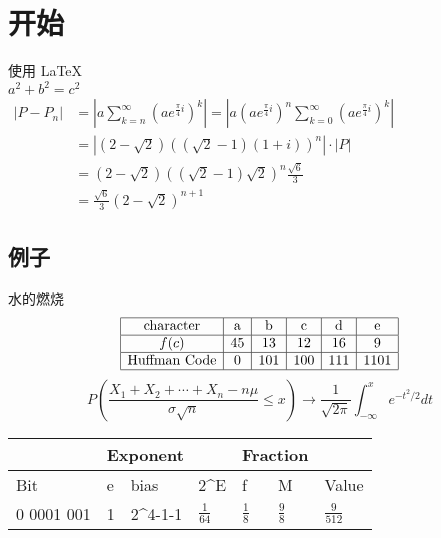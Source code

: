 \documentclass[UTF8]{article}
\begin{document}
       
 
\section{开始}   
使用       
\LaTeX \,\\ 
 $a^2+b^2=c^2$\\
 $\begin{aligned}
    \left|P-P_{n}\right|&=\left|a \sum_{k=n}^{\infty}\left(a e^{\frac{\pi}{4} i}\right)^{k}\right|=\left|a\left(a e^{\frac{\pi}{4} i}\right)^{n} \sum_{k=0}^{\infty}\left(a e^{\frac{\pi}{4} i}\right)^{k}\right|\\&=\left|(2-\sqrt{2})((\sqrt{2}-1)(1+i))^{n}\right| \cdot|P|\\&=(2-\sqrt{2})((\sqrt{2}-1) \sqrt{2})^{n} \frac{\sqrt{6}}{3}\\&=\frac{\sqrt{6}}{3}(2-\sqrt{2})^{n+1}\end{aligned}$

\subsection{例子}  

水的燃烧\cite{1935Can}
\\
$$\begin{array}{|c|c|c|c|c|c|}
    \hline
    \text{character}&\text{a}&\text{b}&\text{c}&\text{d}&\text{e}\\
    \hline
    f(c)&45&13&12&16&9\\
    \hline
    \text{Huffman Code}&0&101&100&111&1101\\
    \hline
    \end{array}$$
$$P\left(\frac{X_{1}+X_{2}+\cdots+X_{n}-n \mu}{\sigma \sqrt{n}} \leq x\right)\to \frac{1}{\sqrt{2 \pi}} \int_{-\infty}^{x} e^{-t^{2} / 2} d t$$


\begin{table}[htbp]
    \begin{tabular}{|l|l|l|l|l|l|l|}
    \hline
               & \multicolumn{3}{l|}{Exponent}                                      & \multicolumn{2}{l|}{Fraction}                   &                                  \\ \hline
    Bit        & e & bias                         & 2^E            & f                      & M                      & Value                            \\ \hline
    0 0001 001 & 1 & 2^{4-1}-1 & $\frac{1}{64} $& $\frac18$ & $\frac98$ & $\frac{9}{512}$ \\ \hline
    \end{tabular}
    \end{table}
\end{document}
